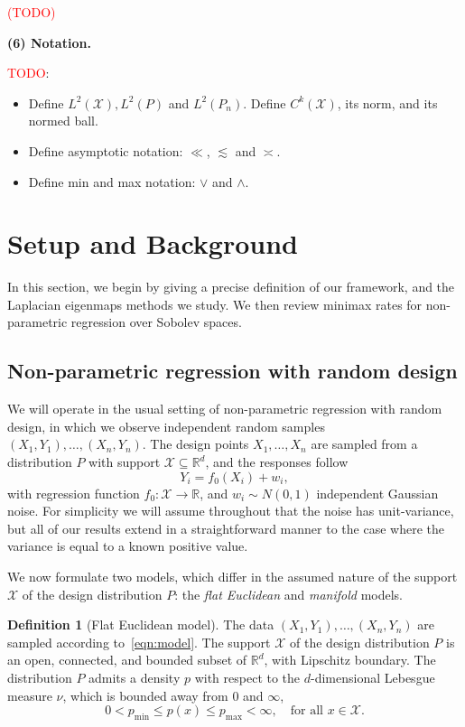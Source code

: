 \documentclass{article}
\newcommand{\Reals}{\mathbb{R}}
\newcommand{\1}{\mathbf{1}}
\newcommand{\Rd}{\Reals^d}
\newcommand{\Leb}{L}
\newcommand{\mc}[1]{\mathcal{#1}}
\theoremstyle{alden}
\theoremstyle{aldenthm}
\theoremstyle{definition}
\newtheorem{definition}{Definition}[section]
\theoremstyle{remark}
\begin{document}
\textcolor{red}{(TODO)}

\textbf{(6) Notation.}

\textcolor{red}{TODO}: 

\begin{itemize}
	\item Define $\Leb^2(\mc{X}), \Leb^2(P)$ and $\Leb^2(P_n)$. Define $C^k(\mc{X})$, its norm, and its normed ball.
	\item Define asymptotic notation: $\ll$, $\lesssim$ and $\asymp$.
	\item Define min and max notation: $\vee$ and $\wedge$.
\end{itemize}



\section{Setup and Background}
\label{sec:setup_main_results}

In this section, we begin by giving a precise definition of our framework, and the Laplacian eigenmaps methods we study. We then review minimax rates for non-parametric regression over Sobolev spaces.

\subsection{Non-parametric regression with random design}
\label{sec:regression_laplacian_eigenmaps}

We will operate in the usual setting of non-parametric regression with random design, in which we observe independent random samples $(X_1,Y_1),\ldots,(X_n,Y_n)$. The design points $X_1,\ldots,X_n$ are sampled from a distribution $P$ with support $\mc{X} \subseteq \Rd$, and the responses follow
\begin{equation}
\label{eqn:model}
Y_i = f_0(X_i) + w_i,
\end{equation}
with regression function $f_0: \mc{X} \to \Reals$, and $w_i \sim N(0,1)$ independent Gaussian noise. For simplicity we will assume throughout that the noise has unit-variance, but all of our results extend in a straightforward manner to the case where the variance is equal to a known positive value. 

We now formulate two models, which differ in the assumed nature of the support $\mc{X}$ of the design distribution $P$: the \emph{flat Euclidean} and \emph{manifold} models.

\begin{definition}[Flat Euclidean model]
	\label{def:model_flat_euclidean}
	The data $(X_1,Y_1),\ldots,(X_n,Y_n)$ are sampled according to~\eqref{eqn:model}. The support $\mc{X}$ of the design distribution $P$ is an open, connected, and bounded subset of $\Rd$, with Lipschitz boundary. The distribution $P$ admits a density $p$ with respect to the $d$-dimensional Lebesgue measure $\nu$, which is bounded away from $0$ and $\infty$,
	\begin{equation*}
	0 < p_{\min} \leq p(x) \leq p_{\max} < \infty, \quad \textrm{for all $x \in \mc{X}$.}
	\end{equation*}
\end{definition}
\end{document}
